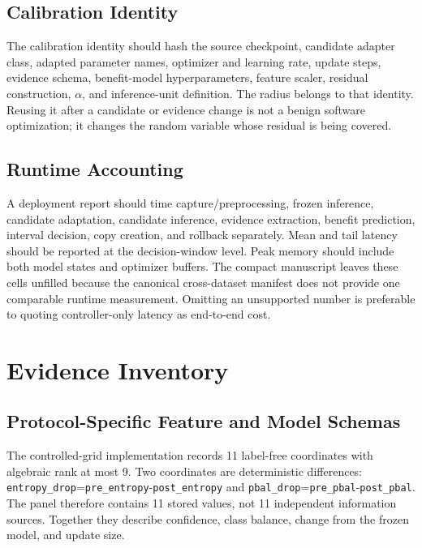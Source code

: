 \subsection{Calibration Identity}

The calibration identity should hash the source checkpoint, candidate adapter class, adapted
parameter names, optimizer and learning rate, update steps, evidence schema, benefit-model
hyperparameters, feature scaler, residual construction, $\alpha$, and inference-unit definition.
The radius belongs to that identity. Reusing it after a candidate or evidence change is not a benign
software optimization; it changes the random variable whose residual is being covered.

\subsection{Runtime Accounting}

A deployment report should time capture/preprocessing, frozen inference, candidate adaptation,
candidate inference, evidence extraction, benefit prediction, interval decision, copy creation, and
rollback separately. Mean and tail latency should be reported at the decision-window level. Peak
memory should include both model states and optimizer buffers. The compact manuscript leaves these
cells unfilled because the canonical cross-dataset manifest does not provide one comparable runtime
measurement. Omitting an unsupported number is preferable to quoting controller-only latency as
end-to-end cost.

\section{Evidence Inventory}
\label{app:compact-evidence}

\subsection{Protocol-Specific Feature and Model Schemas}

The controlled-grid implementation records 11 label-free coordinates with algebraic rank at most 9.
Two coordinates are deterministic differences:
\texttt{entropy\_drop}=\texttt{pre\_entropy}-\texttt{post\_entropy} and
\texttt{pbal\_drop}=\texttt{pre\_pbal}-\texttt{post\_pbal}. The panel therefore contains 11
stored values, not 11 independent information sources. Together they describe confidence, class
balance, change from the frozen model, and update size.


